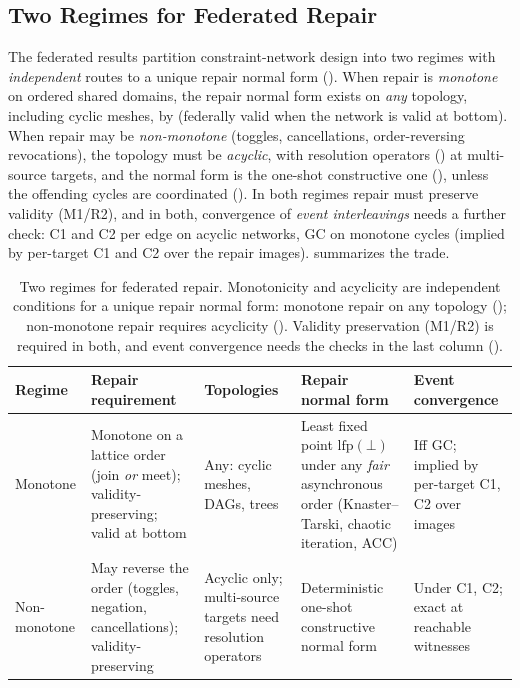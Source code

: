 \documentclass[11pt,a4paper]{article}
\theoremstyle{plain}
\theoremstyle{definition}
\theoremstyle{remark}
\renewcommand{\_}{\textunderscore\allowbreak}
\begin{document}
\subsection{Two Regimes for Federated Repair}
\label{sec:regimes}

The federated results partition constraint-network design into two regimes with
\emph{independent} routes to a unique repair normal form
().  When repair is \emph{monotone} on ordered
shared domains, the repair normal form exists on \emph{any} topology, including
cyclic meshes, by  (federally valid when the network
is valid at bottom).  When repair may be \emph{non-monotone} (toggles,
cancellations, order-reversing revocations), the topology must be
\emph{acyclic}, with resolution operators () at
multi-source targets, and the normal form is the one-shot constructive one
(), unless the offending cycles are coordinated
().  In both regimes repair must preserve validity
(M1/R2), and in both, convergence of \emph{event interleavings} needs a further
check: C1 and C2 per edge on acyclic networks, GC on monotone cycles (implied by
per-target C1 and C2 over the repair images).   summarizes
the trade.

\begin{table}[ht]
\centering
\small
\begin{tabular}{@{}lp{3.0cm}p{2.6cm}p{3.0cm}p{2.6cm}@{}}
\toprule
\textbf{Regime} & \textbf{Repair requirement} & \textbf{Topologies} & \textbf{Repair normal form} & \textbf{Event convergence} \\
\midrule
Monotone &
Monotone on a lattice order (join \emph{or} meet); validity-preserving; valid at bottom &
Any: cyclic meshes, DAGs, trees &
Least fixed point $\mathrm{lfp}(\bot)$ under any \emph{fair} asynchronous order (Knaster--Tarski, chaotic iteration, ACC) &
Iff GC; implied by per-target C1, C2 over images \\[4pt]
Non-monotone &
May reverse the order (toggles, negation, cancellations); validity-preserving &
Acyclic only; multi-source targets need resolution operators &
Deterministic one-shot constructive normal form &
Under C1, C2; exact at reachable witnesses \\
\bottomrule
\end{tabular}
\caption{Two regimes for federated repair.  Monotonicity and acyclicity are
independent conditions for a unique repair normal form: monotone repair on any
topology (); non-monotone repair requires acyclicity
().  Validity preservation (M1/R2) is required in
both, and event convergence needs the checks in the last column
().}
\label{tab:regimes}
\end{table}
\end{document}
